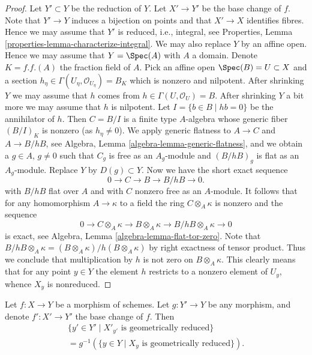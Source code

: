 \begin{proof}
Let $Y' \subset Y$ be the reduction of $Y$. Let $X' \to Y'$
be the base change of $f$. Note that $Y' \to Y$
induces a bijection on points and that $X' \to X$ identifies fibres.
Hence we may assume that $Y'$ is reduced, i.e., integral, see
Properties, Lemma \ref{properties-lemma-characterize-integral}.
We may also replace $Y$ by an affine open. Hence we may assume that
$Y = \Spec(A)$ with $A$ a domain. Denote $K = f.f.(A)$ the
fraction field of $A$.
Pick an affine open $\Spec(B) = U \subset X$ and a section
$h_\eta \in \Gamma(U_\eta, \mathcal{O}_{U_\eta}) = B_K$
which is nonzero and nilpotent.
After shrinking $Y$ we may assume that $h$ comes from
$h \in \Gamma(U, \mathcal{O}_U) = B$. After shrinking $Y$ a bit
more we may assume that $h$ is nilpotent. Let
$I = \{b \in B \mid hb = 0\}$ be the annihilator of $h$.
Then $C = B/I$ is a finite type $A$-algebra whose generic fiber
$(B/I)_K$ is nonzero (as $h_\eta \not = 0$). We apply
generic flatness to $A \to C$ and $A \to B/hB$, see
Algebra, Lemma \ref{algebra-lemma-generic-flatness},
and we obtain a $g \in A$, $g \not = 0$ such that $C_g$ is free as
an $A_g$-module and $(B/hB)_g$ is flat as an $A_g$-module.
Replace $Y$ by $D(g) \subset Y$. Now we have the short exact sequence
$$
0 \to C \to B \to B/hB \to 0.
$$
with $B/hB$ flat over $A$ and with $C$ nonzero free as an $A$-module.
It follows that for any homomorphism $A \to \kappa$ to a field
the ring $C \otimes_A \kappa$ is nonzero and the sequence
$$
0 \to C \otimes_A \kappa \to B \otimes_A \kappa \to
B/hB \otimes_A \kappa \to 0
$$
is exact, see
Algebra, Lemma \ref{algebra-lemma-flat-tor-zero}.
Note that
$B/hB \otimes_A \kappa = (B \otimes_A \kappa) / h(B \otimes_A \kappa)$
by right exactness of tensor product. Thus we conclude that
multiplication by $h$ is not zero on $B \otimes_A \kappa$.
This clearly means that for any point $y \in Y$ the element $h$
restricts to a nonzero element of $U_y$, whence $X_y$ is nonreduced.
\end{proof}

\begin{lemma}
\label{lemma-base-change-fibres-geometrically-reduced}
Let $f : X \to Y$ be a morphism of schemes.
Let $g : Y' \to Y$ be any morphism, and denote
$f' : X' \to Y'$ the base change of $f$.
Then
\begin{align*}
\{y' \in Y' \mid X'_{y'}\text{ is geometrically reduced}\} \\
= g^{-1}(\{y \in Y \mid X_y\text{ is geometrically reduced}\}).
\end{align*}
\end{lemma}

